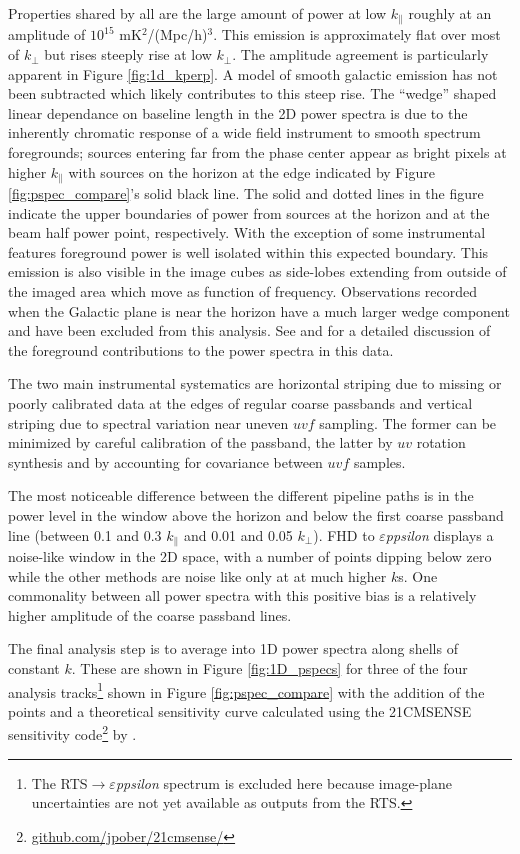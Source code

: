 \documentclass[twolcolumn,iop]{emulateapj}
\def\eppsilon{{\it $\varepsilon$ppsilon}}
\def\dilloncite{\cite{PhysRevD.91.123011} }
\begin{document}
Properties shared by all are the large amount of power at low $k_{\parallel}$ roughly at an amplitude of $10^{15}$ mK$^2$/(Mpc/h)$^3$. This emission is approximately flat over most of $k_{\perp}$ but rises steeply rise at low $k_\perp$. The amplitude agreement is particularly apparent in Figure \ref{fig:1d_kperp}. A model of smooth galactic emission has not been subtracted which likely contributes to this steep rise. The ``wedge'' shaped linear dependance on baseline length in the 2D power spectra is due to the inherently chromatic response of a wide field instrument to smooth spectrum foregrounds; sources entering far from the phase center appear as bright pixels at higher $k_\parallel$ with sources on the horizon at the edge indicated by Figure \ref{fig:pspec_compare}'s  solid black line. The solid and dotted lines in the figure indicate the upper boundaries of power from sources at the horizon and at the beam half power point, respectively.  With the exception of some instrumental features foreground power is well isolated within this expected boundary. This emission is also visible in the image cubes as side-lobes extending from outside of the imaged area which move as function of frequency.  Observations recorded when the Galactic plane is near the horizon have a much larger wedge component and have been excluded from this analysis. See \cite{2015ApJ...804...14T} and \cite{2015ApJ...807L..28T} for a detailed discussion of the foreground contributions to the power spectra in this data. 

The two main instrumental systematics are horizontal striping due to missing or poorly calibrated data at the edges of regular coarse passbands and vertical striping due to spectral variation near uneven $uvf$ sampling. The former can be minimized by careful calibration of the passband, the latter by $uv$ rotation synthesis and by accounting for covariance between $uvf$ samples. 

The most noticeable difference between the different pipeline paths is in the power level in the window above the horizon and below the first coarse passband line (between 0.1 and 0.3 $k_\parallel$ and 0.01 and 0.05 $k_\perp$). FHD to \eppsilon{} displays a noise-like window in the 2D space, with a number of points dipping below zero while the other methods are noise like only at at much higher $k$s.  One commonality between all power spectra with this positive bias is a relatively higher amplitude of the coarse passband lines. 


The final analysis step is to average into 1D power spectra along shells of constant $k$. These are shown in Figure \ref{fig:1D_pspecs} for three of the four analysis tracks\footnote{The RTS$\to$\eppsilon{} spectrum is excluded here because image-plane uncertainties are not yet available as outputs from the RTS.} shown in Figure \ref{fig:pspec_compare} with the addition of the \dilloncite{} points and a theoretical sensitivity curve calculated using the 21CMSENSE sensitivity code\footnote{\url{github.com/jpober/21cmsense/}} by \cite{Pober:2014p10390}.
\end{document}
